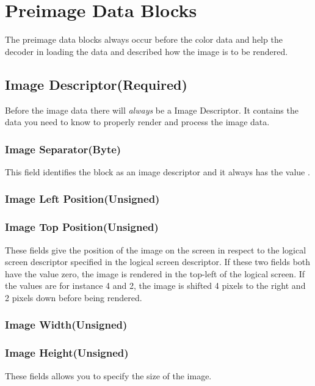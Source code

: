   \section{Preimage Data Blocks}

  The preimage data blocks always occur before the color data and help
  the decoder in loading the data and described how the image is to be
  rendered.

  \subsection{Image Descriptor(Required)}

  Before the image data there will \textit{always} be a Image
  Descriptor. It contains the data you need to know to properly render
  and process the image data.

  \subsubsection{Image Separator(Byte)}

  This field identifies the block as an image descriptor and it always
  has the value .

  \subsubsection{Image Left Position(Unsigned)}
  \subsubsection{Image Top Position(Unsigned)}

  These fields give the position of the image on the screen in respect
  to the logical screen descriptor specified in the logical screen
  descriptor. If these two fields both have the value zero, the image
  is rendered in the top-left of the logical screen. If the values are
  for instance 4 and 2, the image is shifted 4 pixels to the right and
  2 pixels down before being rendered.

  \subsubsection{Image Width(Unsigned)}
  \subsubsection{Image Height(Unsigned)}

  These fields allows you to specify the size of the image.

